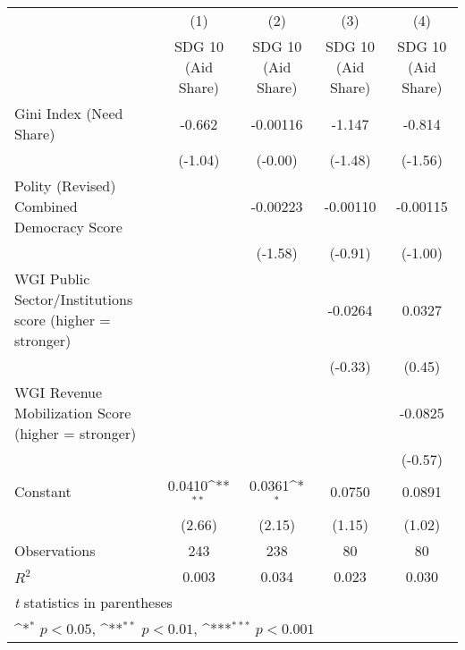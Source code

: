 {
\def\sym#1{\ifmmode^{#1}\else\(^{#1}\)\fi}
\begin{tabular}{l*{4}{c}}
\hline\hline
                &\multicolumn{1}{c}{(1)}&\multicolumn{1}{c}{(2)}&\multicolumn{1}{c}{(3)}&\multicolumn{1}{c}{(4)}\\
                &\multicolumn{1}{c}{SDG 10 (Aid Share)}&\multicolumn{1}{c}{SDG 10 (Aid Share)}&\multicolumn{1}{c}{SDG 10 (Aid Share)}&\multicolumn{1}{c}{SDG 10 (Aid Share)}\\
\hline
Gini Index (Need Share)&   -0.662         & -0.00116         &   -1.147         &   -0.814         \\
                &  (-1.04)         &  (-0.00)         &  (-1.48)         &  (-1.56)         \\
[1em]
Polity (Revised) Combined Democracy Score&                  & -0.00223         & -0.00110         & -0.00115         \\
                &                  &  (-1.58)         &  (-0.91)         &  (-1.00)         \\
[1em]
WGI Public Sector/Institutions score (higher = stronger)&                  &                  &  -0.0264         &   0.0327         \\
                &                  &                  &  (-0.33)         &   (0.45)         \\
[1em]
WGI Revenue Mobilization Score (higher = stronger)&                  &                  &                  &  -0.0825         \\
                &                  &                  &                  &  (-0.57)         \\
[1em]
Constant        &   0.0410\sym{**} &   0.0361\sym{*}  &   0.0750         &   0.0891         \\
                &   (2.66)         &   (2.15)         &   (1.15)         &   (1.02)         \\
\hline
Observations    &      243         &      238         &       80         &       80         \\
\(R^{2}\)       &    0.003         &    0.034         &    0.023         &    0.030         \\
\hline\hline
\multicolumn{5}{l}{\footnotesize \textit{t} statistics in parentheses}\\
\multicolumn{5}{l}{\footnotesize \sym{*} \(p<0.05\), \sym{**} \(p<0.01\), \sym{***} \(p<0.001\)}\\
\end{tabular}
}
